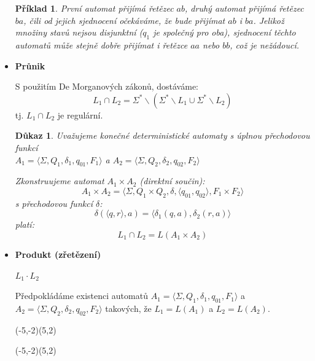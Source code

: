 \documentclass[10pt, a4paper, titlepage]{article}
\theoremstyle{note}
\newtheorem{dukaz}{\textbf{Důkaz}}
\newtheorem{priklad}{\textbf{Příklad}}
\newcommand{\aut}[1]{$A_#1= \langle \Sigma,Q_#1,\delta_#1,q_{0#1},F_#1 \rangle$}
\begin{document}
\begin{itemize}
\begin{priklad}
První automat přijímá řetězec $ab$, druhý automat přijímá řetězec $ba$, čili od jejich sjednocení očekáváme, že bude přijímat $ab$ i $ba$. Jelikož množiny stavů nejsou disjunktní ($q_1$ je společný pro oba), sjednocení těchto automatů může stejně dobře přijímat i řetězce $aa$ nebo $bb$, což je nežádoucí.
\end{priklad}

\item
\textbf{Průnik} 

S použitím De Morganových zákonů, dostáváme:
$$L_1 \cap L_2 = \Sigma^* \backslash (\Sigma^* \backslash L_1 \cup \Sigma^* \backslash L_2 )$$
tj. $L_1 \cap L_2$ je regulární.

\begin{dukaz}
Uvažujeme konečné deterministické automaty s úplnou přechodovou funkcí\\
\aut{1} a \aut{2}

Zkonstruujeme automat $A_1 \times A_2$ (direktní součin):
$$A_1 \times A_2 = \langle \Sigma,Q_1 \times Q_2,\delta, \langle q_{01},q_{02} \rangle,F_1 \times F_2 \rangle$$
s přechodovou funkcí $\delta$:
$$ \delta (\langle q,r \rangle , a) = \langle \delta_1 (q,a), \delta_2 (r,a) \rangle $$
platí:
$$L_1 \cap L_2 = L(A_1 \times A_2)$$
\end{dukaz}

\item
\textbf{Produkt (zřetězení)} 

$L_1 \cdot L_2$

Předpokládáme existenci automatů \aut{1} a \aut{2} takových, že $L_1 = L(A_1)$ a $L_2 = L(A_2) $.

\begin{center}
\begin{VCPicture}{(-5,-2)(5,2)}
\FixStateDiameter{3cm} 
\FixStateDiameter{0.3cm} 

\end{VCPicture}
\end{center}

\begin{center}
\begin{VCPicture}{(-5,-2)(5,2)}
\FixStateDiameter{3cm} 
\FixStateDiameter{0.3cm} 


\end{VCPicture}
\end{center}
\end{itemize}
\end{document}
